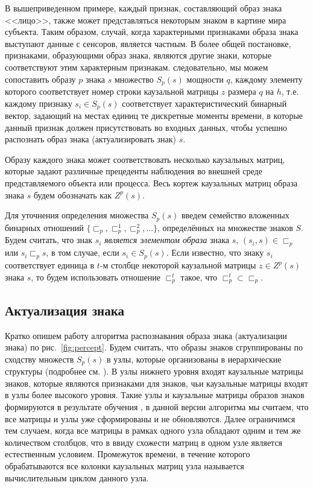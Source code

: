 \documentclass[12pt]{scrartcl}
\begin{document}
	В вышеприведенном примере, каждый признак, составляющий образ знака <<лицо>>, также может представляться некоторым знаком в картине мира субъекта. Таким образом, случай, когда характерными признаками образа знака выступают данные с сенсоров, является частным. В более общей постановке, признаками, образующими образ знака, являются другие знаки, которые соответствуют этим характерным признакам. следовательно, мы можем сопоставить образу $p$ знака $s$ множество $S_p(s)$ мощности $q$, каждому элементу которого соответствует номер строки каузальной матрицы $z$ размера $q$ на $h$, т.е. каждому признаку $s_i\in S_p(s)$ соответствует характеристический бинарный вектор, задающий на местах единиц те дискретные моменты времени, в которые данный признак должен присутствовать во входных данных, чтобы успешно распознать образ знака (актуализировать знак) $s$. 
	
	Образу каждого знака может соответствовать несколько каузальных матриц, которые задают различные прецеденты наблюдения во внешней среде представляемого объекта или процесса. Весь кортеж каузальных матриц образа знака $s$ будем обозначать как $Z^p(s)$. 
		
	Для уточнения определения множества $S_p(s)$ введем семейство вложенных бинарных отношений $\{\sqsubset_p,\sqsubset_p^1,\sqsubset_p^2,\dots\}$, определённых на множестве знаков $S$. Будем считать, что знак $s_i$ \textit{является элементом образа} знака $s$, $(s_i,s)\in\sqsubset_p$ или $s_i\sqsubset_p s$, в том случае, если $s_i\in S_p(s)$. Если известно, что знаку $s_i$ соответствует единица в $t$-м столбце некоторой каузальной матрицы $z\in Z^p(s)$ знака $s$, то будем использовать отношение $\sqsubset_p^t$ такое, что  $\sqsubset_p^t\subset \sqsubset_p$.
	
	\subsection{Актуализация знака}\label{subsec:actual}
	
	Кратко опишем работу алгоритма распознавания образа знака (актуализации знака) по рис.~\ref{fig:percept}. Будем считать, что образы знаков сгруппированы по сходству множеств $S_p(s)$ в узлы, которые организованы в иерархические структуры (подробнее см. \cite{Panov2014d}). В узлы нижнего уровня входят каузальные матрицы знаков, которые являются признаками для знаков, чьи каузальные матрицы входят в узлы более высокого уровня. Такие узлы и каузальные матрицы образов знаков формируются в результате обучения \cite{Panov2014d,Skrynnik2016}, в данной версии алгоритма мы считаем, что все матрицы и узлы уже сформированы и не обновляются. Далее ограничимся тем случаем, когда все матрицы в рамках одного узла обладают одним и тем же количеством столбцов, что в ввиду схожести матриц в одном узле является естественным условием. Промежуток времени, в течение которого обрабатываются все колонки каузальных матриц узла называется вычислительным циклом данного узла.
	
\end{document}
